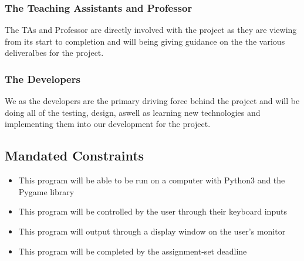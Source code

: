 \documentclass[12pt, titlepage]{article}
\begin{document}
\subsubsection{The Teaching Assistants and Professor}

The TAs and Professor are directly involved with the project as they are viewing from its start to completion and will being giving guidance on the the various deliveralbes for the project.

\subsubsection{The Developers}

We as the developers are the primary driving force behind the project and will be doing all of the testing, design, aswell as learning new technologies and implementing them into our development for the project.

\subsection{Mandated Constraints}

\begin{itemize}
    \item This program will be able to be run on a computer with  Python3 and the Pygame library
    \item This program will be controlled by the user through their keyboard inputs
    \item This program will output through a display window on the user's monitor
    \item This program will be completed by the assignment-set deadline
\end{itemize}
\end{document}
